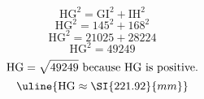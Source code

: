 \[\text{HG}^{2}=\text{GI}^{2}+\text{IH}^{2}\]
\[\text{HG}^{2}=145^{2}+168^{2}\]
\[\text{HG}^{2}=21025+28224\]
\[\text{HG}^{2}=49249\]
\[\text{HG}=\sqrt{\mathstrut 49249}\text{ because HG is positive.}\]
\[\uline{\text{HG}\approx\SI{221.92}{mm}}\]
